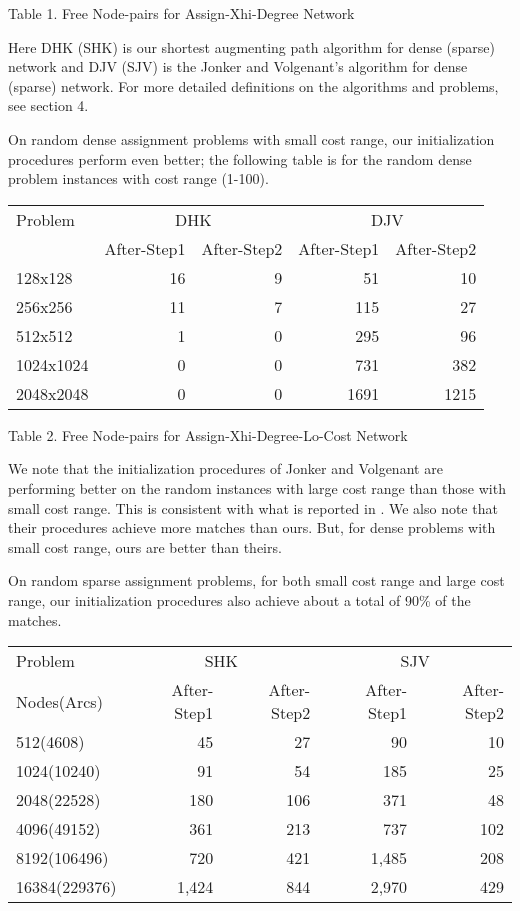 \vskip 2pt
{Table 1. Free Node-pairs for Assign-Xhi-Degree Network}
\vskip 5pt

Here DHK (SHK) is our shortest augmenting path algorithm for dense (sparse)
network and DJV (SJV) is the Jonker and Volgenant's algorithm for dense 
(sparse) network. For more detailed definitions on the algorithms and problems,
see section 4.

On random dense assignment problems with small cost range, 
our initialization procedures perform
even better; the following table is for the random dense problem instances
with cost range (1-100).


\vskip 5pt
{\small
\begin{tabular}{|l|rr|rr|} \hline
 Problem & \multicolumn{2}{c|}{DHK}& \multicolumn{2}{c|}{DJV}\\
&After-Step1 &After-Step2 &After-Step1 &After-Step2\\ \hline
128x128& 16& 9& 51& 10\\ 
256x256& 11& 7& 115& 27\\ 
512x512& 1& 0& 295& 96\\ 
1024x1024& 0& 0& 731& 382\\ 
2048x2048& 0& 0& 1691& 1215\\ \hline
\end{tabular}
}

\vskip 2pt
{Table 2. Free Node-pairs for Assign-Xhi-Degree-Lo-Cost Network}
\vskip 5pt

We note that the
initialization procedures of Jonker and Volgenant are performing better
on the random instances with large cost range than those with small
cost range. This is consistent with what is reported in \cite{jon1}. We
also note that their procedures achieve more matches than ours. But,
for dense problems with small cost range, ours are better than theirs.

On random sparse assignment problems, for both small cost range and
large cost range, our initialization procedures also
achieve about a total of 90\% of the matches. 


\vskip 5pt
{\small
\begin{tabular}{|l|rr|rr|} \hline
 Problem & \multicolumn{2}{c|}{SHK}& \multicolumn{2}{c|}{SJV}\\
Nodes(Arcs)&After-Step1 &After-Step2 &After-Step1 &After-Step2\\ \hline
512(4608)& 45& 27& 90& 10\\ 
1024(10240)& 91& 54& 185& 25\\ 
2048(22528)& 180& 106& 371& 48\\ 
4096(49152)& 361& 213& 737& 102\\ 
8192(106496)& 720& 421& 1,485& 208\\ 
16384(229376)& 1,424& 844& 2,970& 429\\ \hline
\end{tabular}
}

